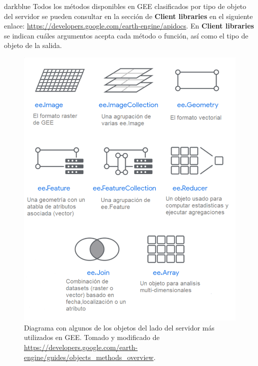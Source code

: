 \documentclass[
  12pt,
  letterpaper,
  twoside]{book}
\begin{document}
\begin{bluebox2}

\begin{awesomeblock}{5pt}{\faLightbulb}{darkblue}
Todos los métodos disponibles en GEE clasificados por tipo de objeto del servidor se pueden consultar en la sección de \textbf{Client libraries} en el siguiente enlace: \url{https://developers.google.com/earth-engine/apidocs}. En \textbf{Client libraries} se indican cuáles argumentos acepta cada método o función, así como el tipo de objeto de la salida.

\end{awesomeblock}

\end{bluebox2}



\begin{figure}[H]

{\centering \includegraphics[width=0.95\linewidth]{Img/objetosServ2} 

}

\caption{Diagrama con algunos de los objetos del lado del servidor más utilizados en GEE. Tomado y modificado de \url{https://developers.google.com/earth-engine/guides/objects_methods_overview}.}\label{fig:f56}
\end{figure}
\end{document}
